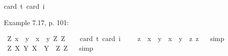 \begin{isabellebody}
{\isacharbrackleft}card\ {\isacharprime}t{\isacharequal}{}{\isacharcomma}\ card\ i{\isacharequal}{}{\isacharbrackright}%
\ %
%
\isamarkupfalse%
\ %
%
%
%
%
\begin{isamarkuptext}%
Example 7.17, p. 101:%
\end{isamarkuptext}\isamarkuptrue%
\isamarkupfalse%
\ {\isachardoublequoteopen}{\isasymlfloor}\isactrlbold {\isasymforall}Z{\isacharcolon}{\isacharcolon}{\isasymup}{\isasymzero}{\isachardot}\ {\isacharparenleft}{\isasymlambda}x{\isacharcolon}{\isacharcolon}{\isasymzero}{\isachardot}\ \ \isactrlbold {\isasymbox}{\isacharparenleft}{\isacharparenleft}{\isasymlambda}y{\isacharcolon}{\isacharcolon}{\isasymzero}{\isachardot}\ \ x\ \isactrlbold {\isasymapprox}\ y{\isacharparenright}\ {\isasymdownharpoonleft}Z{\isacharparenright}{\isacharparenright}\ {\isasymdownharpoonleft}Z{\isasymrfloor}{\isachardoublequoteclose}\ \isanewline
\ \ \isamarkupfalse%
{\isacharbrackleft}card\ {\isacharprime}t{\isacharequal}{}{\isacharcomma}\ card\ i{\isacharequal}{}{\isacharbrackright}%
\ %
%
\isamarkupfalse%
\ %
%
%
%
\isanewline
{}\isamarkupfalse%
\ {\isachardoublequoteopen}{\isasymlfloor}\isactrlbold {\isasymforall}z{\isacharcolon}{\isacharcolon}{\isasymzero}{\isachardot}\ \ {\isacharparenleft}{\isasymlambda}x{\isacharcolon}{\isacharcolon}{\isasymzero}{\isachardot}\ \ \isactrlbold {\isasymbox}{\isacharparenleft}{\isacharparenleft}{\isasymlambda}y{\isacharcolon}{\isacharcolon}{\isasymzero}{\isachardot}\ \ x\ \isactrlbold {\isasymapprox}\ y{\isacharparenright}\ \ z{\isacharparenright}{\isacharparenright}\ z{\isasymrfloor}{\isachardoublequoteclose}%
\ %
%
\isamarkupfalse%
\ simp%
%
%
\isanewline
{}\isamarkupfalse%
\ {\isachardoublequoteopen}{\isasymlfloor}\isactrlbold {\isasymforall}Z{\isacharcolon}{\isacharcolon}{\isasymup}{\isasymzero}{\isachardot}\ {\isacharparenleft}{\isasymlambda}X{\isacharcolon}{\isacharcolon}{\isasymup}{\isasymzero}{\isachardot}\ \isactrlbold {\isasymbox}{\isacharparenleft}{\isacharparenleft}{\isasymlambda}Y{\isacharcolon}{\isacharcolon}{\isasymup}{\isasymzero}{\isachardot}\ X\ \isactrlbold {\isasymapprox}\ Y{\isacharparenright}\ \ Z{\isacharparenright}{\isacharparenright}\ Z{\isasymrfloor}{\isachardoublequoteclose}%
\ %
%
\isamarkupfalse%
\ simp%
%
%
%
\isamarkuptrue%

\end{isabellebody}
